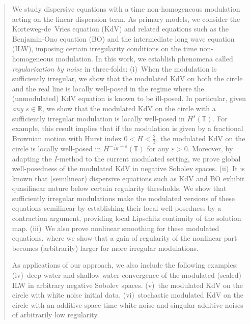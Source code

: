 \documentclass[letterpaper, 11pt,  reqno]{amsart}
\newcommand{\1}{\hspace{0.5mm}\text{I}\hspace{0.5mm}}
\numberwithin{equation}{section}
\numberwithin{theorem}{section}
\begin{document}
 










\begin{abstract}


We study dispersive equations with a time non-homogeneous modulation acting on the linear dispersion term. As  primary models, we consider the Korteweg-de~Vries equation (KdV) and related equations such as the Benjamin-Ono equation (BO) and the intermediate long wave equation (ILW), imposing certain irregularity conditions on the time non-homogeneous modulation. In this work, we establish phenomena called {\it regularization by noise} in three-folds: (i)~When the modulation is sufficiently irregular, we show that the modulated KdV on both the circle and the real line is locally well-posed in the regime where the (unmodulated) KdV equation is known to be ill-posed. In particular, given {\it any} $s \in \mathbb R$, we show that the modulated KdV on the circle with a sufficiently irregular modulation is locally well-posed in $H^s(\mathbb T)$. For example, this result implies that if the modulation is given by a fractional Brownian motion with Hurst index $0 < H < \frac 23$, the modulated KdV on the circle is locally well-posed in $H^{-\frac{1}{2H}+\varepsilon}(\mathbb{T})$ for any $\varepsilon > 0$. Moreover, by adapting the $I$-method to the current modulated setting, we prove global well-posedness of the modulated KdV in negative Sobolev spaces.  (ii)~It is known that  (semilinear) dispersive equations such as KdV and BO exhibit  quasilinear nature below certain  regularity thresholds.
We show that sufficiently irregular modulations make the modulated versions of these equations semilinear by establishing their local well-posedness by a contraction argument, providing local Lipschitz continuity of the solution map. (iii)~We also prove nonlinear smoothing for these modulated equations, where we show that a gain of regularity of the nonlinear part becomes (arbitrarily) larger for more irregular modulations.

As applications of our approach, we also include the following examples: (iv)~deep-water and shallow-water convergence of the modulated (scaled) ILW in arbitrary negative Sobolev spaces. (v)~the modulated KdV on the circle with white noise initial data. (vi)~stochastic modulated KdV on the circle with an additive space-time white noise and singular additive noises of arbitrarily low regularity.











\end{abstract}
\end{document}
